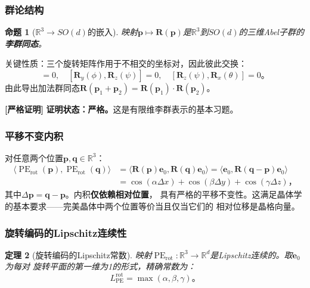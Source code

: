 \documentclass[11pt,a4paper]{article}
\newtheorem{theorem}{定理}[section]
\newtheorem{proposition}[theorem]{命题}
\theoremstyle{remark}
\DeclareMathOperator{\PE}{PE}
\newcommand{\R}{\mathbb{R}}
\newcommand{\rigorous}{\textnormal{\textbf{[严格证明]}}}
\begin{document}
\subsubsection{群论结构}

\begin{proposition}[$\R^3 \to SO(d)$的嵌入]
\label{prop:1.3.1}
映射$\mathbf{p} \mapsto \mathbf{R}(\mathbf{p})$是$\R^3$到$SO(d)$的三维Abel子群的
\textbf{李群同态}。
\end{proposition}

关键性质：三个旋转矩阵作用于不相交的坐标对，因此彼此交换：
\begin{equation}
    [\mathbf{R}_x(\theta), \mathbf{R}_y(\phi)] = 0,\quad
    [\mathbf{R}_y(\phi), \mathbf{R}_z(\psi)] = 0,\quad
    [\mathbf{R}_z(\psi), \mathbf{R}_x(\theta)] = 0。
\end{equation}
由此导出加法群同态$\mathbf{R}(\mathbf{p}_1 + \mathbf{p}_2) = \mathbf{R}(\mathbf{p}_1) \cdot \mathbf{R}(\mathbf{p}_2)$。

\rigorous{} \textbf{证明状态：严格。}这是有限维李群表示的基本习题。

\subsubsection{平移不变内积}

对任意两个位置$\mathbf{p}, \mathbf{q} \in \R^3$：
\begin{align}
    \langle \PE_{\text{rot}}(\mathbf{p}), \PE_{\text{rot}}(\mathbf{q}) \rangle
    &= \langle \mathbf{R}(\mathbf{p})\mathbf{e}_0, \mathbf{R}(\mathbf{q})\mathbf{e}_0 \rangle
     = \langle \mathbf{e}_0, \mathbf{R}(\mathbf{q} - \mathbf{p})\mathbf{e}_0 \rangle \nonumber\\
    &= \cos(\alpha\Delta x) + \cos(\beta\Delta y) + \cos(\gamma\Delta z)，
\end{align}
其中$\Delta\mathbf{p} = \mathbf{q} - \mathbf{p}$。内积\textbf{仅依赖相对位置}，
具有严格的平移不变性。这满足晶体学的基本要求——完美晶体中两个位置等价当且仅当它们的
相对位移是晶格向量。

\subsubsection{旋转编码的Lipschitz连续性}

\begin{theorem}[旋转编码的Lipschitz常数]
\label{thm:1.3.1}
映射$\PE_{\text{rot}}: \R^3 \to \R^d$是Lipschitz连续的。取$\mathbf{e}_0$为每对
旋转平面的第一维为1的形式，精确常数为：
\begin{equation}
    \boxed{
    L_{\PE}^{\text{rot}} = \max(\alpha, \beta, \gamma)
    }。
\end{equation}
\end{theorem}
\end{document}
